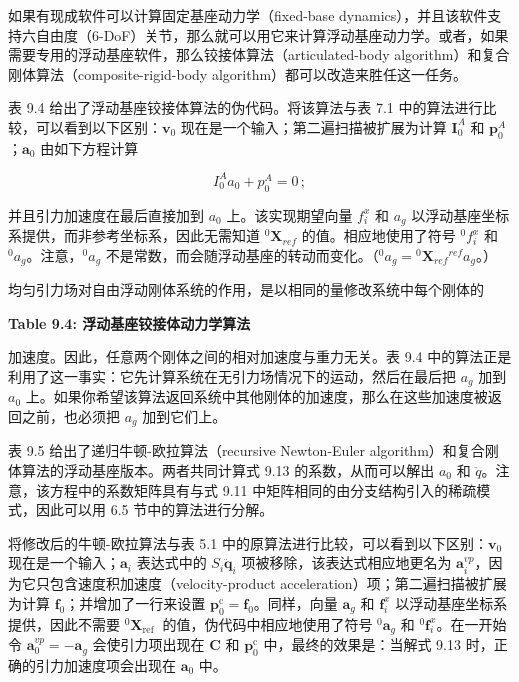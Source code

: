 \documentclass[10pt,a4paper]{book}
\theoremstyle{thmstyle} %
\theoremstyle{defstyle} %
\theoremstyle{prostyle} %
\begin{document}
如果有现成软件可以计算固定基座动力学（fixed-base dynamics），并且该软件支持六自由度（6-DoF）关节，那么就可以用它来计算浮动基座动力学。或者，如果需要专用的浮动基座软件，那么铰接体算法（articulated-body algorithm）和复合刚体算法（composite-rigid-body algorithm）都可以改造来胜任这一任务。



表 9.4 给出了浮动基座铰接体算法的伪代码。将该算法与表 7.1 中的算法进行比较，可以看到以下区别：$\boldsymbol{v}_{0}$ 现在是一个输入；第二遍扫描被扩展为计算 $\boldsymbol{I}_{0}^{A}$ 和 $\boldsymbol{p}_{0}^{A}$；$\boldsymbol{a}_{0}$ 由如下方程计算



$$
I _ { 0 } ^{A} a _ { 0 } + p _ { 0 } ^{A} = 0 \, ;
$$



并且引力加速度在最后直接加到 $a_{0}$ 上。该实现期望向量 $f_{i}^{x}$ 和 $a_{g}$ 以浮动基座坐标系提供，而非参考坐标系，因此无需知道 ${}^{0}\mathbf{X}_{ref}$ 的值。相应地使用了符号 ${}^{0}f_{i}^{x}$ 和 ${}^{0}a_{g}$。注意，${}^{0}a_{g}$ 不是常数，而会随浮动基座的转动而变化。（${}^{0}a_{g}={}^{0}\mathbf{X}_{ref}{}^{ref}a_{g}$。）



均匀引力场对自由浮动刚体系统的作用，是以相同的量修改系统中每个刚体的



\noindent\textbf{Table 9.4: 浮动基座铰接体动力学算法}





加速度。因此，任意两个刚体之间的相对加速度与重力无关。表 9.4 中的算法正是利用了这一事实：它先计算系统在无引力场情况下的运动，然后在最后把 $a_{g}$ 加到 $a_{0}$ 上。如果你希望该算法返回系统中其他刚体的加速度，那么在这些加速度被返回之前，也必须把 $a_{g}$ 加到它们上。



表 9.5 给出了递归牛顿-欧拉算法（recursive Newton-Euler algorithm）和复合刚体算法的浮动基座版本。两者共同计算式 9.13 的系数，从而可以解出 $a_0$ 和 $\ddot{q}$。注意，该方程中的系数矩阵具有与式 9.11 中矩阵相同的由分支结构引入的稀疏模式，因此可以用 6.5 节中的算法进行分解。



将修改后的牛顿-欧拉算法与表 5.1 中的原算法进行比较，可以看到以下区别：$\boldsymbol{v}_{0}$ 现在是一个输入；$\boldsymbol{a}_{i}$ 表达式中的 $S_{i} \ddot{\boldsymbol{q}}_{i}$ 项被移除，该表达式相应地更名为 $\boldsymbol{a}_{i}^{v p}$，因为它只包含速度积加速度（velocity-product acceleration）项；第二遍扫描被扩展为计算 $\boldsymbol{f}_{0}$；并增加了一行来设置 $\boldsymbol{p}_{0}^{\mathrm{c}}=\boldsymbol{f}_{0}$。同样，向量 $\boldsymbol{a}_{g}$ 和 $\boldsymbol{f}_{i}^{x}$ 以浮动基座坐标系提供，因此不需要 ${ }^{0} \boldsymbol{X}_{\text {ref }}$ 的值，伪代码中相应地使用了符号 ${ }^{0} \boldsymbol{a}_{g}$ 和 ${ }^{0} \boldsymbol{f}_{i}^{x}$。在一开始令 $\boldsymbol{a}_{0}^{v p}=-\boldsymbol{a}_{g}$ 会使引力项出现在 $\boldsymbol{C}$ 和 $\boldsymbol{p}_{0}^{\mathrm{c}}$ 中，最终的效果是：当解式 9.13 时，正确的引力加速度项会出现在 $\boldsymbol{a}_{0}$ 中。
\end{document}
